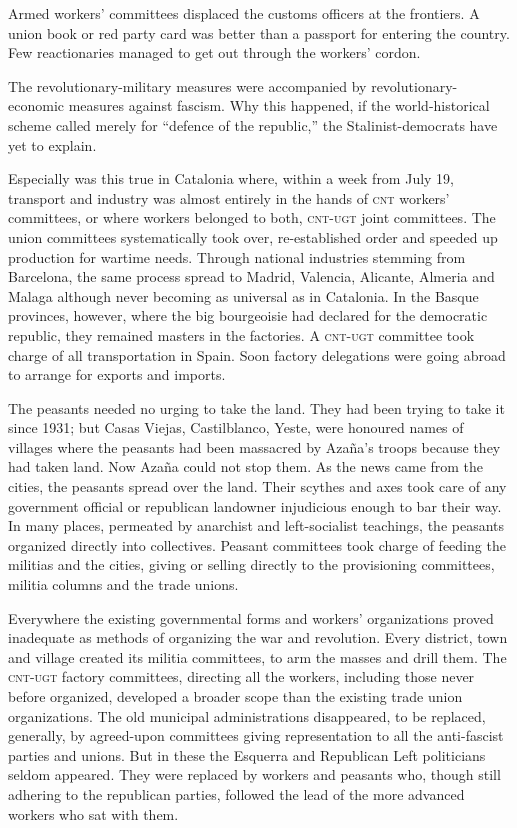 Armed workers’ committees displaced the customs officers at the frontiers. A union book or red party card was better than a passport for entering the country. Few reactionaries managed to get out through the workers’ cordon.

The revolutionary-military measures were accompanied by re\-vo\-lu\-tion\-ary-economic measures against fascism. Why this happened, if the world-historical scheme called merely for ``defence of the republic,'' the Stalinist-democrats have yet to explain.

Especially was this true in Catalonia where, within a week from July 19, transport and industry was almost entirely in the hands of \textsc{cnt} workers’ committees, or where workers belonged to both, \textsc{cnt-ugt} joint committees. The union committees systematically took over, re-established order and speeded up production for wartime needs. Through national industries stemming from Barcelona, the same process spread to Madrid, Valencia, Alicante, Almeria and Malaga although never becoming as universal as in Catalonia. In the Basque provinces, however, where the big bourgeoisie had declared for the democratic republic, they remained masters in the factories. A \textsc{cnt-ugt} committee took charge of all transportation in Spain. Soon factory delegations were going abroad to arrange for exports and imports.

The peasants needed no urging to take the land. They had been trying to take it since 1931; but Casas Viejas, Castilblanco, Yeste, were honoured names of villages where the peasants had been massacred by Azaña’s troops because they had taken land. Now Azaña could not stop them. As the news came from the cities, the peasants spread over the land. Their scythes and axes took care of any government official or republican landowner injudicious enough to bar their way. In many places, permeated by anarchist and left-socialist teachings, the peasants organized directly into collectives. Peasant committees took charge of feeding the militias and the cities, giving or selling directly to the provisioning committees, militia columns and the trade unions.

Everywhere the existing governmental forms and workers’ organizations proved inadequate as methods of organizing the war and revolution. Every district, town and village created its militia committees, to arm the masses and drill them. The \textsc{cnt-ugt} factory committees, directing all the workers, including those never before organized, developed a broader scope than the existing trade union organizations. The old municipal administrations disappeared, to be replaced, generally, by agreed-upon committees giving representation to all the anti-fascist parties and unions. But in these the Esquerra and Republican Left politicians seldom appeared. They were replaced by workers and peasants who, though still adhering to the republican parties, followed the lead of the more advanced workers who sat with them.

